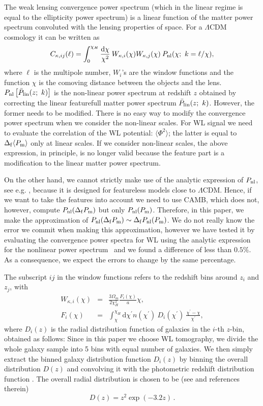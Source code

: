 \documentclass[12pt]{article}
\newcommand{\dd}{\mathrm{d}}
\newcommand{\be}{\begin{equation}}
\newcommand{\ee}{\end{equation}}
\newcommand{\bea}{\begin{eqnarray}}
\newcommand{\eea}{\end{eqnarray}}
\begin{document}
The weak lensing convergence power spectrum (which in the linear regime is equal
to the ellipticity power spectrum) is a linear function of the matter power spectrum convoluted with the
lensing properties of space. For a $\Lambda$CDM cosmology it can be written as 
\begin{equation}
C_{\kappa,ij}(\ell) = 
\int_0^{\chi_H}\frac{\dd\chi}{\chi^2}\:W_{\kappa,i}(\chi)W_{\kappa,j}(\chi)\: P_\mathrm{\rm nl}(\chi;~k=\ell/\chi),
\label{eq:convergence-wl}
\end{equation}
where $\ell$ is the multipole number, $W_i$'s are the window functions and the function $\chi$ is the comoving distance between the objects and the lens. $P_{\rm nl}\left[\bar{P}_{\rm lin}(z;~k)\right]$ is the non-linear power spectrum at redshift $z$ obtained by correcting the linear featurefull matter power spectrum $\bar{P}_{\rm lin} (z;~k)$. However, the former needs to be modified. There is no easy way to modify the convergence power spectrum 
when we consider the non-linear scales. For WL signal we need to evaluate the correlation of the WL potential: $\langle \Phi^2\rangle$; the latter is equal to $\Delta_{\rm f}\langle P_{\rm m}\rangle$ only at linear scales. If we consider non-linear scales, the above expression, in principle, is no longer valid because the feature part is a modification to the linear matter power spectrum. 

On the other hand, we cannot strictly make use of the analytic expression of $P_{\rm nl}$, see e.g. \cite{halo-fit, halo-fit2}, because it is designed for featureless  models close to $\Lambda$CDM. Hence, if we want to take the features into account we need to use CAMB, which does not, however, compute $P_{\rm nl}(\Delta_{\rm f}P_{\rm m})$ but only $P_{\rm nl}(P_{\rm m})$. Therefore, in this paper, we make the approximation of $P_{\rm nl}(\Delta_{\rm f}P_{\rm m})\sim \Delta_{\rm f}P_{\rm nl}(P_{\rm m})$.  
We do not really know the error we commit when making this approximation, however we have tested it by evaluating the convergence power spectra for WL using the analytic expression for the nonlinear power spectrum~\cite{halo-fit} and we found a difference of less than $0.5\%$. 
As a consequence, we expect the errors to change by the same percentage. 


The subscript ${ij}$ in the window functions refers to the redshift bins around $z_i$ and $z_j$, with
\bea
W_{\kappa,i}(\chi) & = & \frac{3\Omega_m}{2\chi_H^2}\frac{F_i(\chi)}{a}\chi, \\
F_i(\chi) & = & \int_\chi^{\chi_H}\dd\chi^\prime n(\chi^\prime)\:D_i(\chi^\prime)\:\frac{\chi^\prime-\chi}{\chi^\prime},
\eea
	where $D_i(z)$ is the radial distribution function of galaxies in the $i$-th $z$-bin, obtained as follows: Since in this paper we choose WL tomography, we divide the whole galaxy sample into 5 bins with equal number of galaxies. We then simply extract the binned galaxy distribution function $D_i(z)$ by binning the overall distribution $D(z)$ and convolving it with the photometric redshift distribution function \cite{AmendolaRR}. The overall radial distribution is chosen to be (see \cite{ZhanUWU} and references therein)
%
\be \label{eq:gal-distr}
D(z) = z^2\exp\left(-3.2 z\right)\,.
\ee
\end{document}
